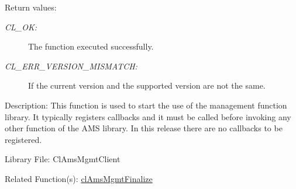 \begin{Desc}
\item[Return values:]
\begin{description}
\item[{\em CL\_\-OK:}]The function executed successfully. \item[{\em CL\_\-ERR\_\-VERSION\_\-MISMATCH:}]If the current version and the supported version are not the same.\end{description}
\end{Desc}
\begin{Desc}
\item[Description:]This function is used to start the use of the management function library. It typically registers callbacks and it must be called before invoking any other function of the AMS library. In this release there are no callbacks to be registered.\end{Desc}
\begin{Desc}
\item[Library File:]Cl\-Ams\-Mgmt\-Client\end{Desc}
\begin{Desc}
\item[Related Function(s):]\hyperlink{pageams102}{cl\-Ams\-Mgmt\-Finalize} \end{Desc}

\newpage
